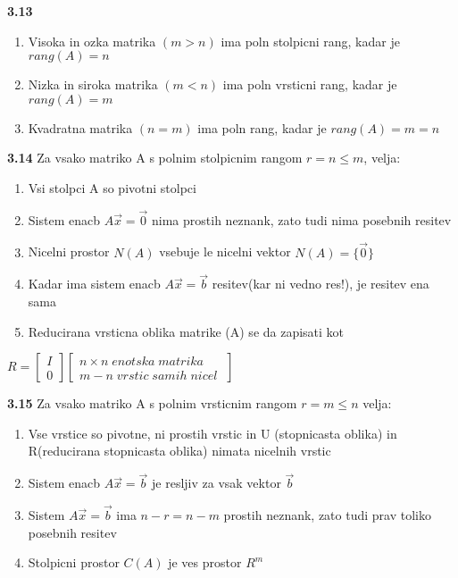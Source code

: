 \documentclass{article}
\begin{document}
\begin{multicols}{2}
\textbf{3.13}
\begin{enumerate}
	\item Visoka in ozka matrika $(m > n)$ ima poln stolpicni rang, kadar je $rang(A) = n$
	\item Nizka in siroka matrika $(m < n)$ ima poln vrsticni rang, kadar je $rang(A) = m$
	\item Kvadratna matrika $(n = m)$ ima poln rang, kadar je $rang(A) = m = n$
\end{enumerate}

\textbf{3.14} Za vsako matriko A s polnim stolpicnim rangom $r = n \leq m$, velja:
\begin{enumerate}
	\item Vsi stolpci A so pivotni stolpci
	\item Sistem enacb $A\vec{x} = \vec{0}$ nima prostih neznank, zato tudi nima posebnih resitev
	\item Nicelni prostor $N(A)$ vsebuje le nicelni vektor $N(A) = \{\vec{0}\}$
	\item Kadar ima sistem enacb $A\vec{x} = \vec{b}$ resitev(kar ni vedno res!), je resitev ena sama
	\item Reducirana vrsticna oblika matrike (A) se da zapisati kot
\end{enumerate}
\begin{center}
	$R =
		\begin{bmatrix}
			I \\
			0
		\end{bmatrix}
		\begin{bmatrix}
			n \times n\; enotska\; matrika \\
			m - n\; vrstic\; samih\; nicel\;
		\end{bmatrix}
	$
\end{center}

\textbf{3.15} Za vsako matriko A s polnim vrsticnim rangom $r = m \leq n$ velja:
\begin{enumerate}
	\item Vse vrstice so pivotne, ni prostih vrstic in U (stopnicasta oblika) in R(reducirana stopnicasta oblika) nimata nicelnih vrstic
	\item Sistem enacb $A\vec{x} = \vec{b}$ je resljiv za vsak vektor $\vec{b}$
	\item Sistem $A\vec{x} = \vec{b}$ ima $n-r = n-m$ prostih neznank, zato tudi prav toliko posebnih resitev
	\item Stolpicni prostor $C(A)$ je ves prostor $R^{m}$
\end{enumerate}


\end{multicols}
\end{document}
